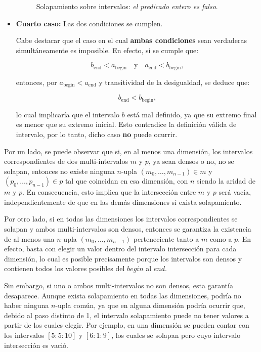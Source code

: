 \begin{itemize}
\begin{figure}[H]
    \caption{Solapamiento sobre intervalos: \textit{el predicado entero es falso}.}
    \label{fig:crit-solapamiento}
\end{figure}
        \item \textbf{Cuarto caso:} Las dos condiciones se cumplen.
        
        Cabe destacar que el caso en el cual \textbf{ambas condiciones} sean verdaderas simultáneamente es imposible. En efecto, si se cumple que:

        \[
        b_{\text{end}} < a_{\text{begin}} \quad \text{y} \quad a_{\text{end}} < b_{\text{begin}},
        \]
        
        entonces, por $a_{\text{begin}} < a_{\text{end}}$ y transitividad de la desigualdad, se deduce que:
        
        \[
        b_{\text{end}} < b_{\text{begin}},
        \]
        
        lo cual implicaría que el intervalo $b$ está mal definido, ya que su extremo final es menor que su extremo inicial. Esto contradice la definición válida de intervalo, por lo tanto, dicho caso \textbf{no} puede ocurrir.
\end{itemize}


Por un lado, se puede observar que si, en al menos una dimensión, los intervalos correspondientes de dos multi-intervalos $m$ y $p$, ya sean densos o no, no se solapan, entonces no existe ninguna $n$-upla $(m_0, \dots, m_{n-1}) \in m$ y $(p_0, \dots, p_{n-1}) \in p$ tal que coincidan en esa dimensión, con $n$ siendo la aridad de $m$ y $p$. En consecuencia, esto implica que la intersección entre $m$ y $p$ será vacía, independientemente de que en las demás dimensiones sí exista solapamiento.

Por otro lado, si en todas las dimensiones los intervalos correspondientes se solapan y ambos multi-intervalos son densos, entonces se garantiza la existencia de al menos una $n$-upla $(m_0, \dots, m_{n-1})$ perteneciente tanto a $m$ como a $p$. En efecto, basta con elegir un valor dentro del intervalo intersección para cada dimensión, lo cual es posible precisamente porque los intervalos son densos y contienen todos los valores posibles del $begin$ al $end$.

Sin embargo, si uno o ambos multi-intervalos no son densos, esta garantía desaparece. Aunque exista solapamiento en todas las dimensiones, podría no haber ninguna $n$-upla común, ya que en alguna dimensión podría ocurrir que, debido al paso distinto de 1, el intervalo solapamiento puede no tener valores a partir de los cuales elegir. Por ejemplo, en una dimensión se pueden contar con los intervalos $[5:5:10]$ y $[6:1:9]$, los cuales se solapan pero cuyo intervalo intersección es vació. 

